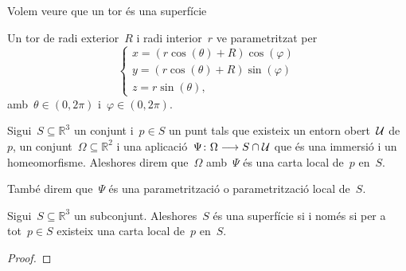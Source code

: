 \documentclass[../../main.tex]{subfiles}
\begin{document}
    \begin{example}
        \label{ex:un tor és una superfície}
        Volem veure que un tor és una superfície
        \begin{solution}
            Un tor de radi exterior~\(R\) i radi interior~\(r\) ve parametritzat per
            \[\begin{cases*}
                x=(r\cos(\theta)+R)\cos(\varphi) \\
                y=(r\cos(\theta)+R)\sin(\varphi) \\
                z=r\sin(\theta),
            \end{cases*}\]
            amb~\(\theta\in(0,2\pi)\) i~\(\varphi\in(0,2\pi)\).
        \end{solution}
    \end{example}
    \begin{definition}
        \label{def:carta local}
        \label{def:parametrització local d'una superfície}
        \label{def:parametrització d'una superfície}
        Sigui~\(S\subseteq\mathbb{R}^{3}\) un conjunt i~\(p\in S\) un punt tals que existeix un entorn obert~\(\mathcal{U}\) de~\(p\), un conjunt~\(\Omega\subseteq\mathbb{R}^{2}\) i una aplicació~\(\Psi\colon\Omega\longrightarrow S\cap\mathcal{U}\) que és una immersió i un homeomorfisme.
        Aleshores direm que~\(\Omega\) amb~\(\Psi\) és una carta local de~\(p\) en~\(S\).

        També direm que~\(\Psi\) és una parametrització o parametrització local de~\(S\).
    \end{definition}
    \begin{theorem}
        \label{thm:ser superfície és equivalent a tenir cartes locals}
        Sigui~\(S\subseteq\mathbb{R}^{3}\) un subconjunt.
        Aleshores~\(S\) és una superfície si i només si per a tot~\(p\in S\) existeix una carta local de~\(p\) en~\(S\).
        \begin{proof}
        \end{proof}
    \end{theorem}
\end{document}
